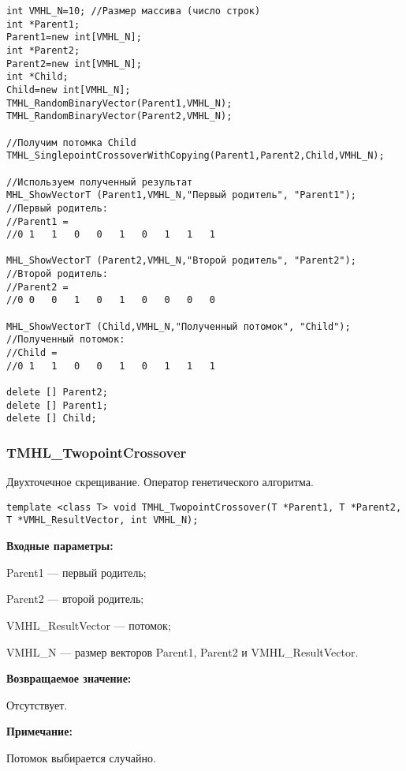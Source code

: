 \documentclass[a4paper,12pt]{article}
\begin{document}
\begin{lstlisting}[label=code_use_TMHL_SinglepointCrossoverWithCopying,caption=Пример использования]
int VMHL_N=10; //Размер массива (число строк)
int *Parent1;
Parent1=new int[VMHL_N];
int *Parent2;
Parent2=new int[VMHL_N];
int *Child;
Child=new int[VMHL_N];
TMHL_RandomBinaryVector(Parent1,VMHL_N);
TMHL_RandomBinaryVector(Parent2,VMHL_N);

//Получим потомка Child
TMHL_SinglepointCrossoverWithCopying(Parent1,Parent2,Child,VMHL_N);

//Используем полученный результат
MHL_ShowVectorT (Parent1,VMHL_N,"Первый родитель", "Parent1");
//Первый родитель:
//Parent1 =	
//0	1	1	0	0	1	0	1	1	1

MHL_ShowVectorT (Parent2,VMHL_N,"Второй родитель", "Parent2");
//Второй родитель:
//Parent2 =	
//0	0	0	1	0	1	0	0	0	0

MHL_ShowVectorT (Child,VMHL_N,"Полученный потомок", "Child");
//Полученный потомок:
//Child =	
//0	1	1	0	0	1	0	1	1	1

delete [] Parent2;
delete [] Parent1;
delete [] Child;
\end{lstlisting}

\subsubsection{TMHL\_TwopointCrossover}\label{TMHL_TwopointCrossover}

Двухточечное скрещивание. Оператор генетического алгоритма.


\begin{lstlisting}[label=code_syntax_TMHL_TwopointCrossover,caption=Синтаксис]
template <class T> void TMHL_TwopointCrossover(T *Parent1, T *Parent2, T *VMHL_ResultVector, int VMHL_N);
\end{lstlisting}

\textbf{Входные параметры:}
 
 Parent1 --- первый родитель;
 
 Parent2 --- второй родитель;
 
 VMHL\_ResultVector --- потомок;
 
 VMHL\_N --- размер векторов Parent1, Parent2 и VMHL\_ResultVector.

\textbf{Возвращаемое значение:}

 Отсутствует.
 
\textbf{ Примечание:}

 Потомок выбирается случайно.
 
\end{document}
